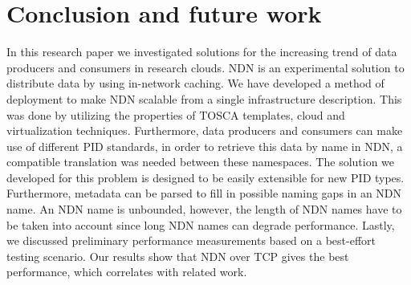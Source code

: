 \section{Conclusion and future work}
\label{fut}
\label{conc}








In this research paper we investigated solutions for the increasing trend of data producers and consumers in research clouds. NDN is an experimental solution to distribute data by using in-network caching. We have developed a method of deployment to make NDN scalable from a single infrastructure description. This was done by utilizing the properties of TOSCA templates, cloud and virtualization techniques. Furthermore, data producers and consumers can make use of different PID standards, in order to retrieve this data by name in NDN, a compatible translation was needed between these namespaces. The solution we developed for this problem is designed to be easily extensible for new PID types. Furthermore, metadata can be parsed to fill in possible naming gaps in an NDN name. An NDN name is unbounded, however, the length of NDN names have to be taken into account since long NDN names can degrade performance. Lastly, we discussed preliminary performance measurements based on a best-effort testing scenario. Our results show that NDN over TCP gives the best performance, which correlates with related work.

